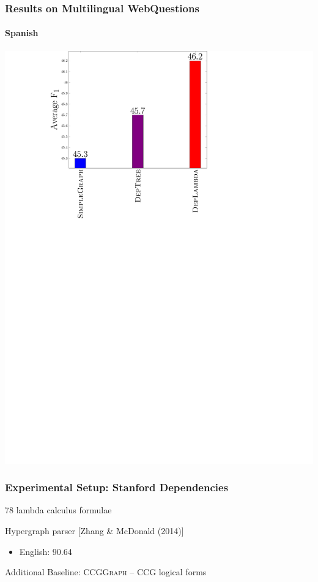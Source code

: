 \documentclass[mathserif,12pt]{beamer}
\newcommand \ccggraph{\textsc{CCGGraph}\xspace}
\begin{document}
\begin{frame}
\frametitle{Results on Multilingual WebQuestions}
\framesubtitle{Spanish}
\centering
\large
\vspace{0.4em}
\includegraphics[trim=9.5em 0em 23em 0.5em,clip=true,scale=0.5]{figures/deplambda_results_plot_ud-es}
\end{frame}

\begin{frame}
\frametitle{Experimental Setup: Stanford Dependencies} 
\large
78 lambda calculus formulae 

\vspace{2em}
Hypergraph parser {[\small Zhang \& McDonald (2014)]}
\begin{itemize}
\item English: 90.64
\end{itemize}

\vspace{2em}
Additional Baseline: 
\ccggraph \; -- CCG logical forms
\end{frame}
\end{document}
